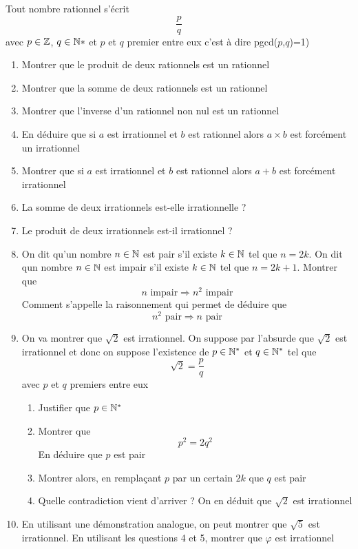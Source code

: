 Tout nombre rationnel s'écrit $$\dfrac{p}{q}$$ avec $p\in \mathbb{Z}$, $q\in \mathbb{N}*$ et $p$ et $q$ premier entre eux c'est à dire pgcd($p$,$q$)=1)
\begin{enumerate}
\item Montrer que le produit de deux rationnels est un rationnel
\item Montrer que la somme de deux rationnels est un rationnel
\item Montrer que l'inverse d'un rationnel non nul est un rationnel
\item En déduire que si $a$ est irrationnel et $b$ est rationnel alors $a\times b$ est forcément un irrationnel
\item Montrer que si $a$ est irrationnel et $b$ est rationnel alors $a+b$ est forcément irrationnel
\item La somme de deux irrationnels est-elle irrationnelle ?
\item Le produit de deux irrationnels est-il irrationnel ?
\item On dit qu'un nombre $n \in \mathbb{N}$ est pair s'il existe $k\in\mathbb{N}$ tel que $n= 2k$. On dit qun nombre $n\in \mathbb{N}$ est impair s'il existe $k\in\mathbb{N}$ tel que $n=2k+1$. Montrer que $$n \text{ impair} \Rightarrow n^2 \text{ impair}$$
Comment s'appelle la raisonnement qui permet de déduire que 
$$\boxed{n^2 \text{ pair} \Rightarrow n \text{ pair}}$$
\item On va montrer que $\sqrt{2}$ est irrationnel. On suppose par l'absurde que $\sqrt{2}$ est irrationnel et donc on suppose l'existence de $p \in \mathbb{N}^*$ et $q \in \mathbb{N}^*$ tel que $$\sqrt{2} = \dfrac{p}{q}$$ avec $p$ et $q$ premiers entre eux
\begin{enumerate}
\item Justifier que $p\in \mathbb{N}^*$
\item Montrer que 
$$p^2 = 2 q^2$$
En déduire que $p$ est pair
\item Montrer alors, en remplaçant $p$ par un certain $2k$ que $q$ est pair
\item Quelle contradiction vient d'arriver ? On en déduit que $\sqrt{2}$ est irrationnel
\end{enumerate}
\item En utilisant une démonstration analogue, on peut montrer que $\sqrt{5}$ est irrationnel. En utilisant les questions 4 et 5, montrer que $\varphi$ est irrationnel
\end{enumerate}
